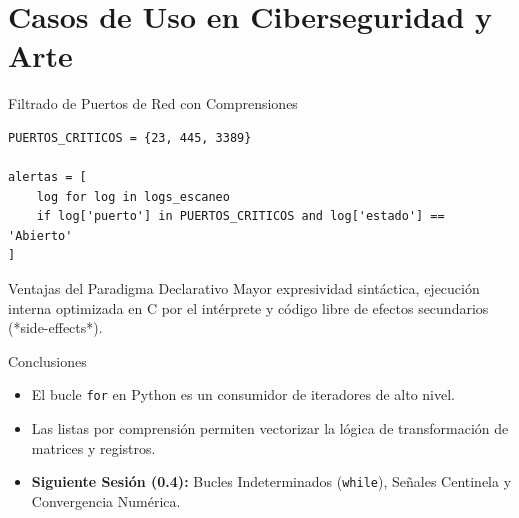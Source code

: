\documentclass[aspectratio=169]{beamer}
\begin{document}
\section{Casos de Uso en Ciberseguridad y Arte}

\begin{frame}[fragile]{Filtrado de Puertos de Red con Comprensiones}
\begin{lstlisting}
PUERTOS_CRITICOS = {23, 445, 3389}

alertas = [
    log for log in logs_escaneo 
    if log['puerto'] in PUERTOS_CRITICOS and log['estado'] == 'Abierto'
]
\end{lstlisting}
\begin{exampleblock}{Ventajas del Paradigma Declarativo}
    Mayor expresividad sintáctica, ejecución interna optimizada en C por el intérprete y código libre de efectos secundarios (*side-effects*).
\end{exampleblock}
\end{frame}

\begin{frame}{Conclusiones}
    \begin{itemize}
        \item El bucle \texttt{for} en Python es un consumidor de iteradores de alto nivel.
        \item Las listas por comprensión permiten vectorizar la lógica de transformación de matrices y registros.
        \item \textbf{Siguiente Sesión (0.4):} Bucles Indeterminados (\texttt{while}), Señales Centinela y Convergencia Numérica.
    \end{itemize}
\end{frame}
\end{document}
